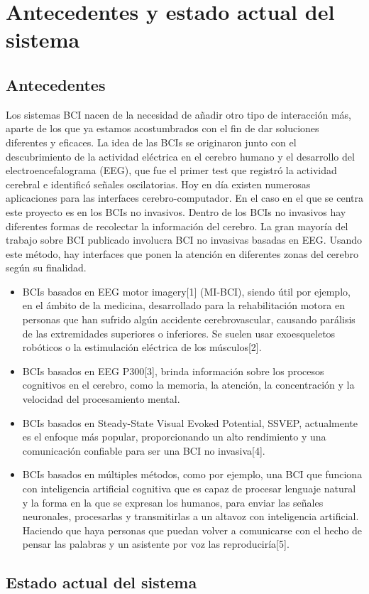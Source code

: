 \section{Antecedentes y estado actual del sistema}

\subsection{Antecedentes}
Los sistemas BCI nacen de la necesidad de añadir otro tipo de interacción más, aparte de los que ya estamos acostumbrados con el fin de dar soluciones diferentes y eficaces. 
La idea de las BCIs se originaron junto con el descubrimiento de la actividad eléctrica en el cerebro humano y el desarrollo del electroencefalograma (EEG), que fue el primer test que registró la actividad cerebral e identificó señales oscilatorias.
Hoy en día existen numerosas aplicaciones para las interfaces cerebro-computador. En el caso en el que se centra este proyecto es en los BCIs no invasivos. Dentro de los BCIs no invasivos hay diferentes formas de recolectar la información del cerebro. La gran mayoría del trabajo sobre BCI publicado involucra BCI no invasivas basadas en EEG. Usando este método, hay interfaces que ponen la atención en diferentes zonas del cerebro según su finalidad.

\begin{itemize}
  \item BCIs basados en EEG motor imagery[1] (MI-BCI), siendo útil por ejemplo, en el ámbito de la medicina, desarrollado para la rehabilitación motora en personas que han sufrido algún accidente cerebrovascular, causando parálisis de las extremidades superiores o inferiores. Se suelen usar exoesqueletos robóticos o la estimulación eléctrica de los músculos[2]. 
  \item BCIs basados en EEG P300[3], brinda información sobre los procesos cognitivos en el cerebro, como la memoria, la atención, la concentración y la velocidad del procesamiento mental. 
  \item BCIs basados en Steady-State Visual Evoked Potential, SSVEP, actualmente es el enfoque más popular, proporcionando un alto rendimiento y una comunicación confiable para ser una BCI no invasiva[4].
  \item BCIs basados en múltiples métodos, como por ejemplo, una BCI que funciona con inteligencia artificial cognitiva que es capaz de procesar lenguaje natural y la forma en la que se expresan los humanos, para enviar las señales neuronales, procesarlas y transmitirlas a un altavoz con inteligencia artificial. Haciendo que haya personas que puedan volver a comunicarse con el hecho de pensar las palabras y un asistente por voz las reproduciría[5].



\end{itemize}

\subsection{Estado actual del sistema}



